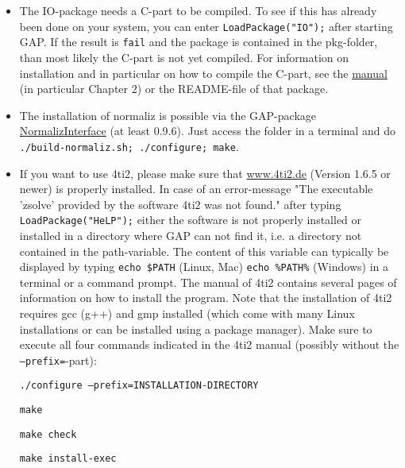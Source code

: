 \documentclass[a4paper,11pt]{report}
\begin{document}
{{\begin{itemize}
\begin{itemize}
 Usually all these packages should come with a sufficiently recent
GAP-installation (4.8.2 or newer) and should be contained in the pkg-folder of
the GAP-installation. To see if they are working you can load them by typing \texttt{LoadPackage("[name]");} after starting GAP, where \texttt{[name]} is the name of the package. 
\end{itemize}
 
\item  The IO-package needs a C-part to be compiled. To see if this has already been
done on your system, you can enter \texttt{LoadPackage("IO");} after starting GAP. If the result is \texttt{fail} and the package is contained in the pkg-folder, than most likely the C-part is
not yet compiled. For information on installation and in particular on how to
compile the C-part, see the \href{http://gap-packages.github.io/io/doc/chap0.html} {manual} (in particular Chapter 2) or the README-file of that package.

 
\item  The installation of normaliz is possible via the GAP-package \href{http://gap-packages.github.io/NormalizInterface//} {NormalizInterface} (at least 0.9.6). Just access the folder in a terminal and do \texttt{./build-normaliz.sh; ./configure; make}. 
\item  If you want to use 4ti2, please make sure that \href{http://www.4ti2.de} {www.4ti2.de} (Version 1.6.5 or newer) is properly installed. In case of an error-message
"The executable 'zsolve' provided by the software 4ti2 was not found." after
typing \texttt{LoadPackage("HeLP");} either the software is not properly installed or installed in a directory
where GAP can not find it, i.e. a directory not contained in the
path-variable. The content of this variable can typically be displayed by
typing \texttt{echo \$PATH} (Linux, Mac) \texttt{echo \%PATH\%} (Windows) in a terminal or a command prompt. The manual of 4ti2 contains
several pages of information on how to install the program. Note that the
installation of 4ti2 requires gcc (g++) and gmp installed (which come with
many Linux installations or can be installed using a package manager). Make
sure to execute all four commands indicated in the 4ti2 manual (possibly
without the \texttt{--prefix=}-part):

 \texttt{./configure --prefix=INSTALLATION-DIRECTORY}

 \texttt{make}

 \texttt{make check}

 \texttt{make install-exec}


\end{itemize}}}
\end{document}
